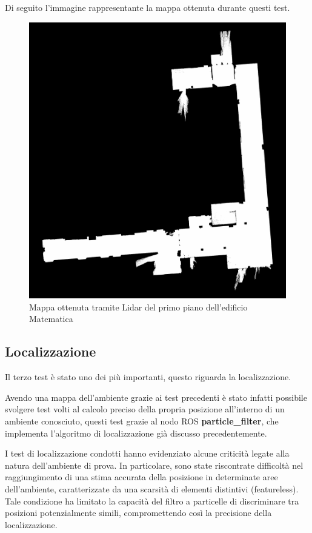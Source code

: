 \noindent Di seguito l'immagine rappresentante la mappa ottenuta durante questi test.
\begin{figure}[h]
  \centering
  \includegraphics[width=1\textwidth]{figures/franco_map.png}
  \caption{Mappa ottenuta tramite Lidar del primo piano dell'edificio Matematica}
  \label{Mappa ottenuta tramite Lidar del primo piano dell'edificio Matematica}
\end{figure}

\subsection{Localizzazione}
Il terzo test è stato uno dei più importanti, questo riguarda la localizzazione.

\noindent Avendo una mappa dell'ambiente grazie ai test precedenti è stato infatti possibile svolgere test volti al calcolo preciso della propria posizione all'interno di un ambiente conosciuto, questi test grazie al nodo ROS \textbf{particle\_filter}, che implementa l'algoritmo di localizzazione già discusso precedentemente.

\noindent I test di localizzazione condotti hanno evidenziato alcune criticità legate alla natura dell'ambiente di prova. In particolare, sono state riscontrate difficoltà nel raggiungimento di una stima accurata della posizione in determinate aree dell'ambiente, caratterizzate da una scarsità di elementi distintivi (featureless). Tale condizione ha limitato la capacità del filtro a particelle di discriminare tra posizioni potenzialmente simili, compromettendo così la precisione della localizzazione.

